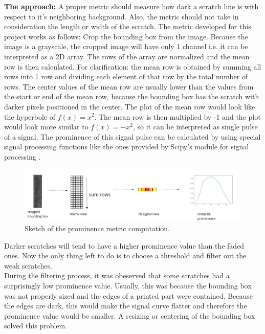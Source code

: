 \textbf{The approach:}
A proper metric should measure how dark a scratch line is with respect to it's neighboring background. Also, the metric should not take in consideration the length or width of the scratch.
The metric developed for this project works as follows:
Crop the bounding box from the image. Because the image is a grayscale, the cropped image will have only 1 channel i.e. it can be interpreted as a 2D array. The rows of the array are normalized and the mean row is then calculated. For clarification: the mean row is obtained by summing all rows into 1 row and dividing each element of that row by the total number of rows. The center values of the mean row are usually lower than the values from the start or end of the mean row, because the bounding box has the scratch with darker pixels positioned in the center. The plot of the mean row would look like the hyperbole of $f(x)=x^2$. The mean row is then multiplied by -1 and the plot would look more similar to $f(x)=-x^2$, so it can be interpreted as single pulse of a signal. The prominence of this signal pulse can be calculated by using special signal processing functions like the ones provided by Scipy's module for signal processing \cite{scipy_signal}. \\
\begin{figure}[!h]
\centering
\captionsetup{justification=centering,margin=2cm}
\includegraphics[width=\columnwidth]{images/implementation/prominence_metric}
\caption{Sketch of the prominence metric computation.}
\label{impl:prominence_metric}
\end{figure}


Darker scratches will tend to have a higher prominence value than the faded ones. Now the only thing left to do is to choose a threshold and filter out the weak scratches. \\
During the filtering process, it was obeserved that some scratches had a surprisingly low prominence value. Usually, this was because the bounding box was not properly sized and the edges of a printed part were contained. Because the edges are dark, this would make the signal curve flatter and therefore the prominence value would be smaller. A resizing or centering of the bounding box solved this problem.

